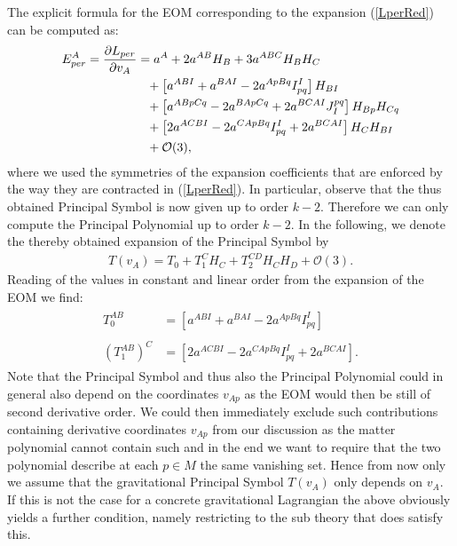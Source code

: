 The explicit formula for the EOM corresponding to the expansion (\ref{LperRed}) can be computed as:
\begin{align}\label{EOMPert}
    \begin{aligned}
    E_{per}^A = \frac{\partial L_{per}}{\partial v_A} &= a^A + 2 a^{AB}H_B + 3a^{ABC}H_B H_C \\
    &\hphantom{=}+ \left [a^{ABI} + a^{BAI} - 2 a^{ApBq}I_{pq}^I  \right ] H_{BI} \\
    &\hphantom{=}+ \left[a^{ABpCq} -2a^{BApCq} +2a^{BCAI} J_I^{pq} \right]H_{Bp}H_{Cq} \\
    &\hphantom{=}+ \left [2a^{ACBI} -2a^{CApBq}I_{pq}^I + 2a^{BCAI} \right ]H_C H_{BI} \\
    &\hphantom{=}+ \mathcal{O}(3),
    \end{aligned}
\end{align}
where we used the symmetries of the expansion coefficients that are enforced by the way they are contracted in (\ref{LperRed}).
In particular, observe that the thus obtained Principal Symbol is now given up to order $k-2$. Therefore we can only compute the Principal Polynomial up to order $k-2$. In the following, we denote the thereby obtained expansion of the Principal Symbol by 
\begin{align}
    T(v_A) = T_0 + T_1^CH_C + T_2^{CD}H_CH_D + \mathcal{O}(3).
\end{align}
Reading of the values in constant and linear order from the expansion of the EOM we find:
\begin{align}
    \begin{aligned}
    T_0^{AB} &= \left [a^{ABI} + a^{BAI} - 2 a^{ApBq}I_{pq}^I  \right ]\\
    \\
    (T_1^{AB})^C &= \left [2a^{ACBI} -2a^{CApBq}I_{pq}^I + 2a^{BCAI} \right ]. 
    \end{aligned}
\end{align}
Note that the Principal Symbol and thus also the Principal Polynomial could in general also depend on the coordinates $v_{Ap}$ as the EOM would then be still of second derivative order. We could then immediately exclude such contributions containing derivative coordinates $v_{Ap}$ from our discussion as the matter polynomial cannot contain such and in the end we want to require that the two polynomial describe at each $p \in M$ the same vanishing set. Hence from now only we assume that the gravitational Principal Symbol $T(v_A)$ only depends on $v_A$. If this is not the case for a concrete gravitational Lagrangian the above obviously yields a further condition, namely restricting to the sub theory that does satisfy this. 

